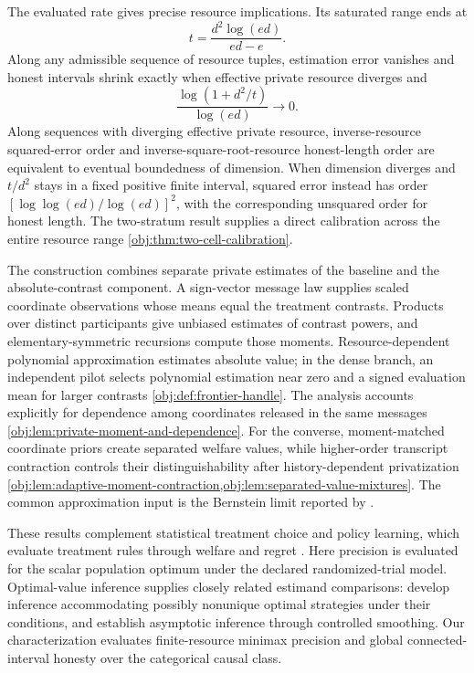 The evaluated rate gives precise resource implications. Its saturated range ends at
\[
t=\frac{d^2\log(ed)}{ed-e}.
\]
Along any admissible sequence of resource tuples, estimation error vanishes and honest intervals shrink exactly when effective private resource diverges and
\[
\frac{\log(1+d^2/t)}{\log(ed)}\longrightarrow0.
\]
Along sequences with diverging effective private resource, inverse-resource squared-error order and inverse-square-root-resource honest-length order are equivalent to eventual boundedness of dimension. When dimension diverges and \(t/d^2\) stays in a fixed positive finite interval, squared error instead has order \([\log\log(ed)/\log(ed)]^2\), with the corresponding unsquared order for honest length. The two-stratum result supplies a direct calibration across the entire resource range \cref{obj:thm:two-cell-calibration}.

The construction combines separate private estimates of the baseline and the absolute-contrast component. A sign-vector message law supplies scaled coordinate observations whose means equal the treatment contrasts. Products over distinct participants give unbiased estimates of contrast powers, and elementary-symmetric recursions compute those moments. Resource-dependent polynomial approximation estimates absolute value; in the dense branch, an independent pilot selects polynomial estimation near zero and a signed evaluation mean for larger contrasts \cref{obj:def:frontier-handle}. The analysis accounts explicitly for dependence among coordinates released in the same messages \cref{obj:lem:private-moment-and-dependence}. For the converse, moment-matched coordinate priors create separated welfare values, while higher-order transcript contraction controls their distinguishability after history-dependent privatization \cref{obj:lem:adaptive-moment-contraction,obj:lem:separated-value-mixtures}. The common approximation input is the Bernstein limit reported by \citet[Section~3.1, p.~8]{CaiLow2011Nonsmooth}.

These results complement statistical treatment choice and policy learning, which evaluate treatment rules through welfare and regret \citep{Manski2004,Kitagawa2018,Athey2021}. Here precision is evaluated for the scalar population optimum under the declared randomized-trial model. Optimal-value inference supplies closely related estimand comparisons: \citet{LuedtkeVanDerLaan2016OptimalValue} develop inference accommodating possibly nonunique optimal strategies under their conditions, and \citet[Theorem~3.3]{WhitehouseChenAusternSyrgkanis2026Softmax} establish asymptotic inference through controlled smoothing. Our characterization evaluates finite-resource minimax precision and global connected-interval honesty over the categorical causal class.

